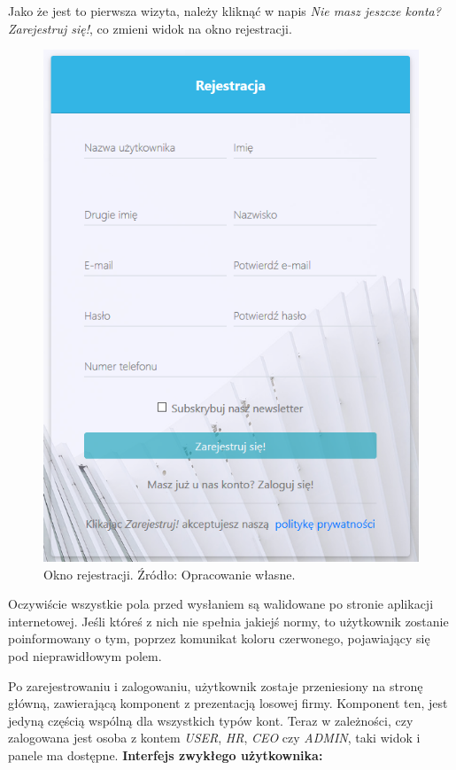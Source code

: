 \documentclass[twoside]{projektInzynierskiMS}
\numberwithin{figure}{section}
\begin{document}
Jako że jest to pierwsza wizyta, należy kliknąć w napis \textit{Nie masz jeszcze konta? Zarejestruj się!}, co zmieni widok na okno rejestracji.

\newpage

\begin{figure}[h!]
    \centering
    \includegraphics[scale=0.9]{images/rejestracja.png}
    \caption{Okno rejestracji. Źródło: Opracowanie własne.}
    \label{fig:okno_rejestracji}
\end{figure}

Oczywiście wszystkie pola przed wysłaniem są walidowane po stronie aplikacji internetowej. Jeśli któreś z nich nie spełnia jakiejś normy, to użytkownik zostanie poinformowany o tym, poprzez komunikat koloru czerwonego, pojawiający się pod nieprawidłowym polem.

\newpage

Po zarejestrowaniu i zalogowaniu, użytkownik zostaje przeniesiony na stronę główną, zawierającą komponent z prezentacją losowej firmy. Komponent ten, jest jedyną częścią wspólną dla wszystkich typów kont. Teraz w zależności, czy zalogowana jest osoba z kontem \textit{USER}, \textit{HR}, \textit{CEO} czy \textit{ADMIN}, taki widok i panele ma dostępne. \newline
\textbf{Interfejs zwykłego użytkownika:}
\end{document}
